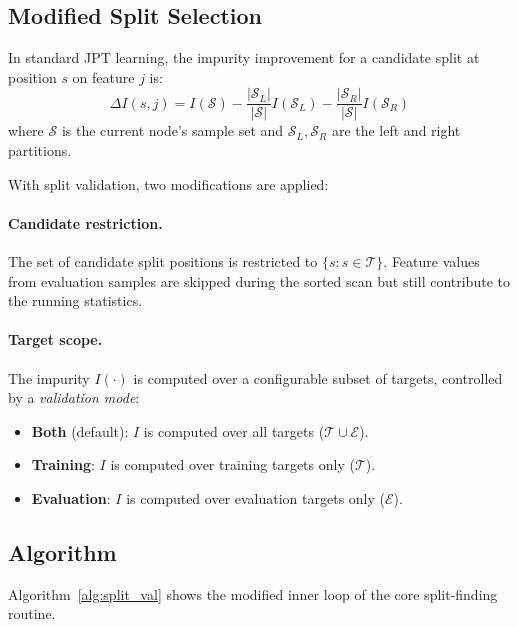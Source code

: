 \documentclass[11pt,a4paper]{article}
\begin{document}
\subsection{Modified Split Selection}

In standard JPT learning, the impurity improvement for a candidate split at
position $s$ on feature $j$ is:
\begin{equation}
    \Delta I(s, j) = I(\mathcal{S}) -
    \frac{|\mathcal{S}_L|}{|\mathcal{S}|} I(\mathcal{S}_L) -
    \frac{|\mathcal{S}_R|}{|\mathcal{S}|} I(\mathcal{S}_R)
\end{equation}
where $\mathcal{S}$ is the current node's sample set and
$\mathcal{S}_L, \mathcal{S}_R$ are the left and right partitions.

With split validation, two modifications are applied:

\paragraph{Candidate restriction.}
The set of candidate split positions is restricted to
$\{s : s \in \mathcal{T}\}$. Feature values from evaluation samples are skipped
during the sorted scan but still contribute to the running statistics.

\paragraph{Target scope.}
The impurity $I(\cdot)$ is computed over a configurable subset of targets,
controlled by a \emph{validation mode}:
\begin{itemize}
    \item \textbf{Both} (default): $I$ is computed over all targets
          ($\mathcal{T} \cup \mathcal{E}$).
    \item \textbf{Training}: $I$ is computed over training targets only
          ($\mathcal{T}$).
    \item \textbf{Evaluation}: $I$ is computed over evaluation targets only
          ($\mathcal{E}$).
\end{itemize}

\subsection{Algorithm}

Algorithm~\ref{alg:split_val} shows the modified inner loop of the
core split-finding routine.
\end{document}
